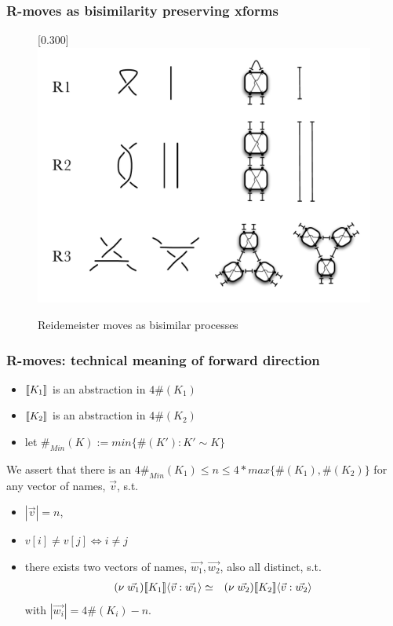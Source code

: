 \documentclass{beamer}
\begin{document}
\begin{frame}
  \frametitle{R-moves as bisimilarity preserving xforms}
  \begin{figure}[tbp]
    \centering
    \scalebox{0.30}[0.300]{\includegraphics[viewport=30 30 810 550]{ReidemeisterMovesAsCircuits21072006}}
    \caption{ Reidemeister moves as bisimilar processes }
  \end{figure}
\end{frame}

\begin{frame}
  \frametitle{R-moves: technical meaning of forward direction}
  
  \begin{itemize}
    \item $[\![ K_{1} ]\!]$ is an abstraction in $4\#(K_{1})$
    \item $[\![ K_{2} ]\!]$ is an abstraction in $4\#(K_{2})$
    \item let $\#_{Min}(K) := min\{\#(K') : K' \sim K \}$
  \end{itemize}
  
  We assert that there is an $4\#_{Min}(K_1) \leq n \leq 4*max\{ \#(K_1),
  \#(K_2) \}$ for any vector of names, $\vec{v}$, s.t.

  \begin{itemize}
  \item $|\vec{v}| = n$,
  \item $v[i] \neq v[j] \iff i \neq j $
  \item there exists two vectors of names, $\vec{w_1}, \vec{w_2}$,
    also all distinct, s.t.
    \begin{eqnarray}
      (\nu \; \vec{w_1})[\![ K_{1} ]\!]\langle \vec{v}:\vec{w_1} \rangle & \simeq & (\nu \; \vec{w_2})[\![ K_{2} ]\!]\langle \vec{v}:\vec{w_2} \rangle \nonumber
    \end{eqnarray}
    with $|\vec{w_i}| = 4\#(K_{i}) - n$.
  \end{itemize}    

\end{frame}
\end{document}
